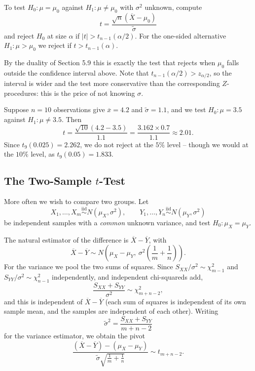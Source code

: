\documentclass[a4paper]{scrartcl}
\begin{document}
\begin{definition}
  To test $H_0 : \mu = \mu_0$ against $H_1 : \mu \neq \mu_0$ with $\sigma^2$ unknown, compute
  $$
  t = \frac{\sqrt n\left(\overline{X}-\mu_0\right)}{\tilde\sigma}
  $$
  and reject $H_0$ at size $\alpha$ if $|t| > t_{n-1}(\alpha/2)$. For the one-sided alternative $H_1 : \mu > \mu_0$ we reject if $t > t_{n-1}(\alpha)$.
\end{definition}

By the duality of Section 5.9 this is exactly the test that rejects when $\mu_0$ falls outside the confidence interval above. Note that $t_{n-1}(\alpha/2) > z_{\alpha/2}$, so the interval is wider and the test more conservative than the corresponding $Z$-procedures: this is the price of not knowing $\sigma$.

\begin{example}
  Suppose $n = 10$ observations give $\overline{x} = 4.2$ and $\tilde\sigma = 1.1$, and we test $H_0: \mu = 3.5$ against $H_1 : \mu \neq 3.5$. Then
  $$
  t = \frac{\sqrt{10}(4.2 - 3.5)}{1.1} = \frac{3.162\times 0.7}{1.1} \approx 2.01.
  $$
  Since $t_9(0.025) = 2.262$, we do not reject at the $5\%$ level -- though we would at the $10\%$ level, as $t_9(0.05) = 1.833$.
\end{example}

\subsection{The Two-Sample \texorpdfstring{$t$}{t}-Test}

More often we wish to compare two groups. Let
$$
X_1,\dots,X_m \stackrel{\text{iid}}{\sim} N(\mu_X,\sigma^2), \qquad Y_1,\dots,Y_n \stackrel{\text{iid}}{\sim}N(\mu_Y,\sigma^2)
$$
be independent samples with a \emph{common} unknown variance, and test $H_0 : \mu_X = \mu_Y$.

The natural estimator of the difference is $\overline{X}-\overline{Y}$, with
$$
\overline{X}-\overline{Y}\sim N\left(\mu_X - \mu_Y,\ \sigma^2\left(\frac{1}{m}+\frac{1}{n}\right)\right).
$$
For the variance we pool the two sums of squares. Since $S_{XX}/\sigma^2 \sim \chi^2_{m-1}$ and $S_{YY}/\sigma^2\sim\chi^2_{n-1}$ independently, and independent chi-squareds add,
$$
\frac{S_{XX}+S_{YY}}{\sigma^2}\sim\chi^2_{m+n-2},
$$
and this is independent of $\overline{X}-\overline{Y}$ (each sum of squares is independent of its own sample mean, and the samples are independent of each other). Writing
$$
\tilde\sigma^2 = \frac{S_{XX}+S_{YY}}{m+n-2}
$$
for the  variance estimator, we obtain the pivot
$$
\frac{\left(\overline{X}-\overline{Y}\right) - (\mu_X-\mu_Y)}{\tilde\sigma\sqrt{\frac 1m + \frac 1n}} \sim t_{m+n-2}.
$$
\end{document}
